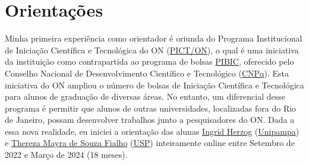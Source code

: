 \documentclass[10pt,a4paper,oneside]{book}
\begin{document}
\section{Orientações}
\label{sec_orientacao}

Minha primeira experiência como orientador é oriunda do Programa Institucional de Iniciação Científica e Tecnológica do ON (\href{https://www.gov.br/observatorio/pt-br/assuntos/programas-academicos/iniciacao-cientifica-e-tecnologica/apresentacao}{PICT/ON}), o qual é uma iniciativa da instituição como contrapartida ao programa de bolsas \href{http://portal-adm.cnpq.br/web/guest/pibic/}{PIBIC}, oferecido pelo Conselho Nacional de Desenvolvimento Científico e Tecnológico (\href{https://www.gov.br/cnpq/pt-br}{CNPq}). Esta iniciativa do ON ampliou o número de bolsas de Iniciação Científica e Tecnológica para alunos de graduação de diversas áreas. No entanto, um diferencial desse programa é permitir que alunos de outras universidades, localizadas fora do Rio de Janeiro, possam desenvolver trabalhos junto a pesquisadores do ON. Dada a essa nova realidade, eu iniciei a orientação das alunas \href{http://lattes.cnpq.br/4746789434324199}{Ingrid Herzog} (\href{https://unipampa.edu.br/portal/}{Unipampa}) e \href{http://lattes.cnpq.br/6698175242371919}{Thereza Mayra de Souza Fialho} (\href{https://www5.usp.br/}{USP}) inteiramente online entre Setembro de 2022 e Março de 2024 (18 meses).
\end{document}
